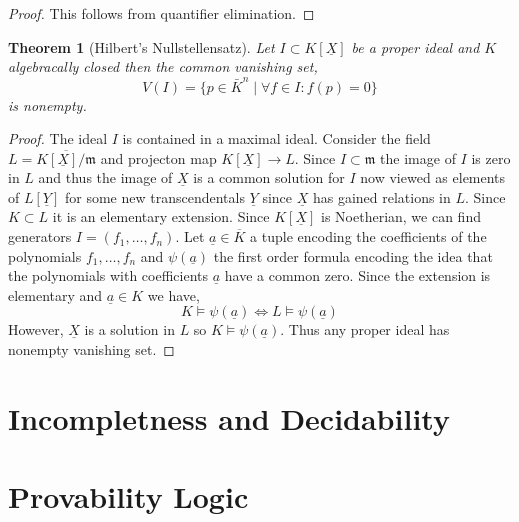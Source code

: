 \documentclass[12pt]{article}
\newcommand{\entails}{\models}
\newcommand{\ul}[1]{\underline{#1}}
\newcommand{\maxideal}{\mathfrak{m}}
\theoremstyle{theorem}
\newtheorem{theorem}{Theorem}[section]
\theoremstyle{definition}
\theoremstyle{definition}
\theoremstyle{remark}
\theoremstyle{definition}
\theoremstyle{remark}
\begin{document}
\begin{proof}
This follows from quantifier elimination.
\end{proof}

\begin{theorem}[Hilbert's Nullstellensatz]
Let $I \subset K[\ul{X}]$ be a proper ideal and $K$ algebracally closed then the common vanishing set,
\[ V(I) = \{p \in \bar{K}^n \mid \forall f \in I : f(p) = 0 \} \]
is nonempty. 
\end{theorem}

\begin{proof}
The ideal $I$ is contained in a maximal ideal. Consider the field $L = \overline{K[\ul{X}] / \maxideal}$ and projecton map $K[\ul{X}] \to L$. Since $I \subset \maxideal$ the image of $I$ is zero in $L$ and thus the image of $\ul{X}$ is a common solution for $I$ now viewed as elements of $L[\ul{Y}]$ for some new transcendentals $\ul{Y}$ since $\ul{X}$ has gained relations in $L$. Since $K \subset L$ it is an elementary extension.
Since $K[\ul{X}]$ is Noetherian, we can find generators $I = (f_1, \dots, f_n)$. Let $\ul{a} \in \overline{K}$ a tuple encoding the coefficients of the polynomials $f_1, \dots, f_n$ and $\psi(\ul{a})$ the first order formula encoding the idea that the polynomials with coefficients $\ul{a}$ have a common zero. Since the extension is elementary and $\ul{a} \in K$ we have,
\[ K \entails \psi(\ul{a}) \iff L \entails \psi(\ul{a}) \]
However, $\ul{X}$ is a solution in $L$ so $K \entails \psi(\ul{a})$. Thus any proper ideal has nonempty vanishing set. 
\end{proof}

\section{Incompletness and Decidability}

\section{Provability Logic}
\end{document}
